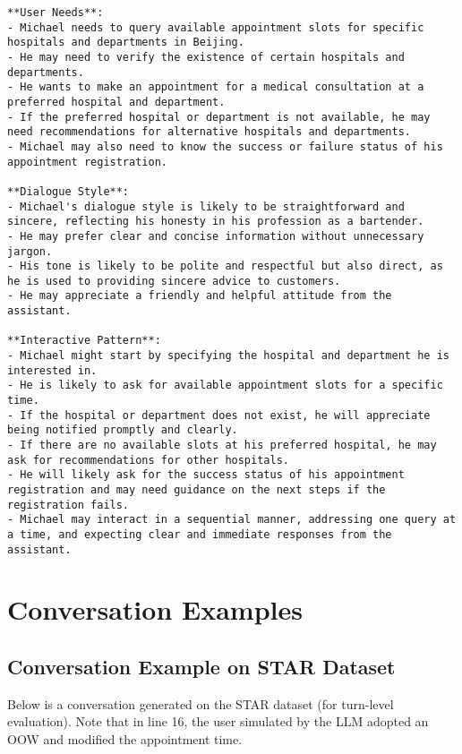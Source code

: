 \begin{envnew}
\begin{lstlisting}[language={}, caption=Example of user profile]
**User Needs**:  
- Michael needs to query available appointment slots for specific hospitals and departments in Beijing.  
- He may need to verify the existence of certain hospitals and departments.  
- He wants to make an appointment for a medical consultation at a preferred hospital and department.  
- If the preferred hospital or department is not available, he may need recommendations for alternative hospitals and departments.  
- Michael may also need to know the success or failure status of his appointment registration.  

**Dialogue Style**:  
- Michael's dialogue style is likely to be straightforward and sincere, reflecting his honesty in his profession as a bartender.  
- He may prefer clear and concise information without unnecessary jargon.  
- His tone is likely to be polite and respectful but also direct, as he is used to providing sincere advice to customers.  
- He may appreciate a friendly and helpful attitude from the assistant.  

**Interactive Pattern**:  
- Michael might start by specifying the hospital and department he is interested in.  
- He is likely to ask for available appointment slots for a specific time.  
- If the hospital or department does not exist, he will appreciate being notified promptly and clearly.  
- If there are no available slots at his preferred hospital, he may ask for recommendations for other hospitals.  
- He will likely ask for the success status of his appointment registration and may need guidance on the next steps if the registration fails.  
- Michael may interact in a sequential manner, addressing one query at a time, and expecting clear and immediate responses from the assistant.
\end{lstlisting}







\section{Conversation Examples} \label{appendix:conversation_examples}

\subsection{Conversation Example on STAR Dataset} \label{appendix:conversation_example_star}
Below is a conversation generated on the STAR dataset (for turn-level evaluation). 
Note that in line 16, the user simulated by the LLM adopted an  OOW and modified the appointment time.


\end{envnew}
